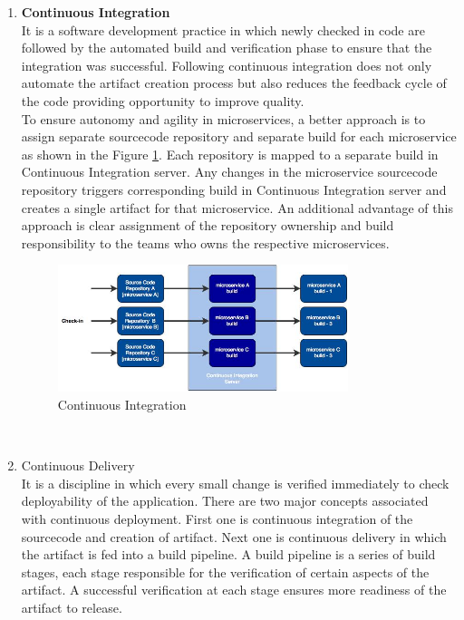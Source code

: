 \begin{enumerate}
\item \textbf{Continuous Integration} \\
It is a software development practice in which newly checked in code are followed by the automated build and verification phase to ensure that the integration was successful. Following continuous integration does not only automate the artifact creation process but also reduces the feedback cycle of the code providing opportunity to improve quality.
\\
To ensure autonomy and agility in microservices, a better approach is to assign separate sourcecode repository and separate build for each microservice as shown in the Figure \ref{fig:challanges_of_microservices_architecture/deployment/continuous_integration}. Each repository is mapped to a separate build in Continuous Integration server. Any changes in the microservice sourcecode repository triggers corresponding build in Continuous Integration server and creates a single artifact for that microservice. An additional advantage of this approach is clear assignment of the repository ownership and build responsibility to the teams who owns the respective microservices.  \cite{Newman:2015aa} \cite{Fowler:2006ab}
\begin{figure}[H]
\begin{center}
\includegraphics[width=0.8\textwidth]{figures/challenges_five_continuous_integration}
\caption{Continuous Integration \cite{Newman:2015aa}}
\label{fig:challanges_of_microservices_architecture/deployment/continuous_integration}
\end{center}
\end{figure}
\\
\item Continuous Delivery
\\
It is a discipline in which every small change is verified immediately to check deployability of the application. There are two major concepts associated with continuous deployment. First one is continuous integration of the sourcecode and creation of artifact. Next one is continuous delivery in which the artifact is fed into a build pipeline. A build pipeline is a series of build stages, each stage responsible for the verification of certain aspects of the artifact. A successful verification at each stage ensures more readiness of the artifact to release.

\end{enumerate}
